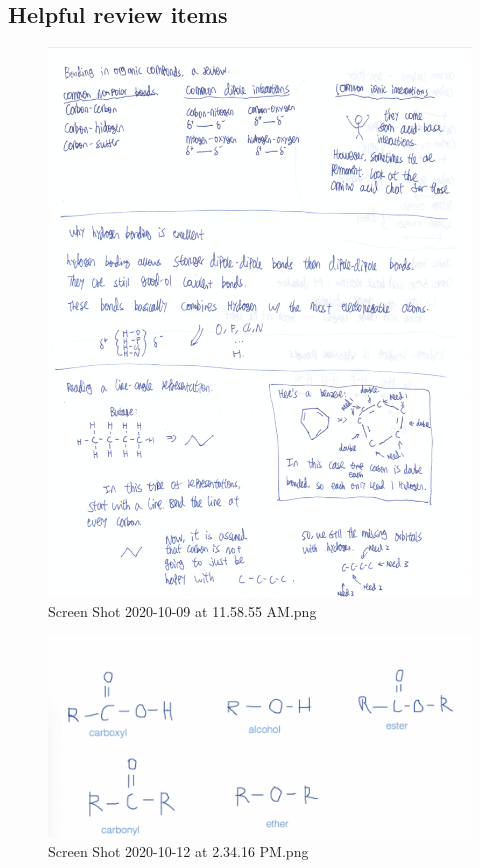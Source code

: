 \documentclass[letterpaper]{article}
\begin{document}
\subsection{Helpful review items}
\label{sec:org09b26d6}
\begin{figure}[htbp]
\centering
\includegraphics[width=.9\linewidth]{Screen Shot 2020-10-09 at 11.58.55 AM.png}
\caption{Screen Shot 2020-10-09 at 11.58.55 AM.png}
\end{figure}

\begin{figure}[htbp]
\centering
\includegraphics[width=.9\linewidth]{Screen Shot 2020-10-12 at 2.34.16 PM.png}
\caption{Screen Shot 2020-10-12 at 2.34.16 PM.png}
\end{figure}
\end{document}
